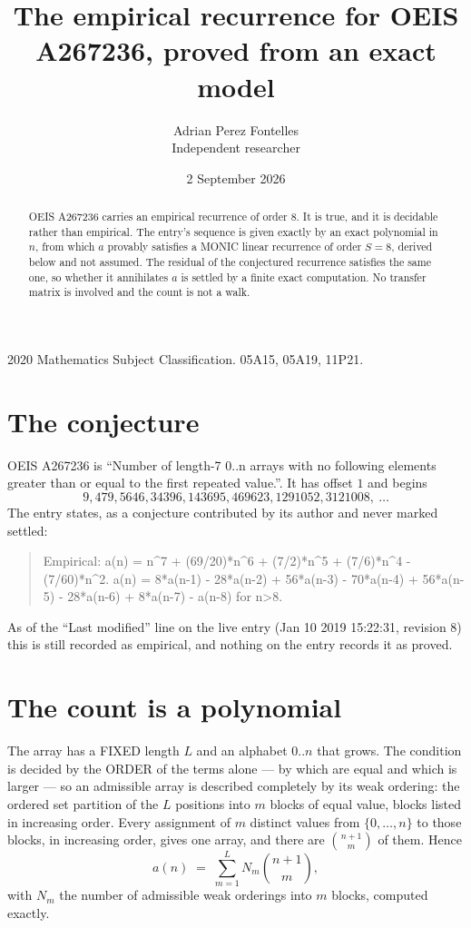 \documentclass[11pt,a4paper]{article}
\title{The empirical recurrence for OEIS A267236, proved from an exact model}
\author{Adrian Perez Fontelles\\ \small Independent researcher}
\date{2 September 2026}
\theoremstyle{plain}
\theoremstyle{definition}
\begin{document}
\maketitle

\begin{abstract}
OEIS A267236 carries an empirical recurrence of order $8$. It is true, and it is
decidable rather than empirical. The entry's sequence is given exactly by an exact polynomial in $n$, from
which $a$ provably satisfies a MONIC linear recurrence of order $S=8$, derived below and not
assumed. The residual of the conjectured recurrence satisfies the same one, so whether it
annihilates $a$ is settled by a finite exact computation. No transfer matrix is involved and
the count is not a walk.
\end{abstract}

\noindent\small 2020 Mathematics Subject Classification. 05A15, 05A19, 11P21.\normalsize

\section{The conjecture}

OEIS A267236 is ``Number of length-7 0..n arrays with no following elements greater than or equal to the first repeated value.''. It has offset $1$ and begins
\[
9, 479, 5646, 34396, 143695, 469623, 1291052, 3121008,\ \dots
\]
The entry states, as a conjecture contributed by its author and never marked settled:
\begin{quote}
Empirical: a(n) = n\^{}7 + (69/20)*n\^{}6 + (7/2)*n\^{}5 + (7/6)*n\^{}4 - (7/60)*n\^{}2. a(n) = 8*a(n-1) - 28*a(n-2) + 56*a(n-3) - 70*a(n-4) + 56*a(n-5) - 28*a(n-6) + 8*a(n-7) - a(n-8) for n>8.
\end{quote}
As of the ``Last modified'' line on the live entry (Jan 10 2019 15:22:31, revision 8)
this is still recorded as empirical, and nothing on the entry records it as proved.

\section{The count is a polynomial}

The array has a FIXED length $L$ and an alphabet $0..n$ that grows. The condition is decided by
the ORDER of the terms alone --- by which are equal and which is larger --- so an admissible
array is described completely by its weak ordering: the ordered set partition of the $L$
positions into $m$ blocks of equal value, blocks listed in increasing order. Every assignment
of $m$ distinct values from $\{0,\dots,n\}$ to those blocks, in increasing order, gives one
array, and there are $\binom{n+1}{m}$ of them. Hence
\[
a(n)\;=\;\sum_{m=1}^{L} N_m\binom{n+1}{m},
\]
with $N_m$ the number of admissible weak orderings into $m$ blocks, computed exactly.
\end{document}
